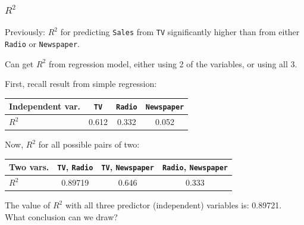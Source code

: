 \documentclass{beamer}
\theoremstyle{example}
\newcommand{\ttt}[1]{{\small\texttt{#1}}}
\begin{document}
\begin{frame}
\frametitle{$R^2$}
Previously: $R^2$ for predicting \ttt{Sales} from \ttt{TV} significantly higher than from either \ttt{Radio} or \ttt{Newspaper}. 

\pause
Can get $R^2$ from regression model, either using 2 of the variables, or using all 3. 

First, recall result from simple regression:
\begin{center}
    \begin{tabular}{l c c c}
        Independent var. & \ttt{TV} & \ttt{Radio} & \ttt{Newspaper} \\ 
        \hline 
        $R^2$       &  0.612  &  0.332  &  0.052
    \end{tabular}
\end{center}

\pause
Now, $R^2$ for all possible pairs of two:
\begin{center}
    \begin{tabular}{l c c c}
        Two vars. & \ttt{TV}, \ttt{Radio} & \ttt{TV}, \ttt{Newspaper} & \ttt{Radio}, \ttt{Newspaper} \\ 
        \hline 
        $R^2$       &  0.89719  &  0.646  &  0.333
    \end{tabular}
\end{center}

\pause
The value of $R^2$ with all three predictor (independent) variables is: 0.89721. {\color{strings}What conclusion can we draw?}

\end{frame}
\end{document}
